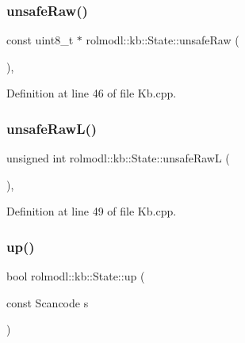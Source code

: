 \subsubsection{\texorpdfstring{unsafeRaw()}{unsafeRaw()}}
{\footnotesize\ttfamily const uint8\+\_\+t $\ast$ rolmodl\+::kb\+::\+State\+::unsafe\+Raw (\begin{DoxyParamCaption}{ }\end{DoxyParamCaption})\hspace{0.3cm}{\ttfamily [static]}, {\ttfamily [noexcept]}}



Definition at line 46 of file Kb.\+cpp.

\mbox{\label{classrolmodl_1_1rolmodl_1_1kb_1_1_state_a9d75c27364e30390190fae9aa40e72f9}} 
\subsubsection{\texorpdfstring{unsafeRawL()}{unsafeRawL()}}
{\footnotesize\ttfamily unsigned int rolmodl\+::kb\+::\+State\+::unsafe\+RawL (\begin{DoxyParamCaption}{ }\end{DoxyParamCaption})\hspace{0.3cm}{\ttfamily [static]}, {\ttfamily [noexcept]}}



Definition at line 49 of file Kb.\+cpp.

\mbox{\label{classrolmodl_1_1rolmodl_1_1kb_1_1_state_a46c1389b6ef3ee77b3bbf71a5ac19849}} 
\subsubsection{\texorpdfstring{up()}{up()}\hspace{0.1cm}{\footnotesize\ttfamily [1/2]}}
{\footnotesize\ttfamily bool rolmodl\+::kb\+::\+State\+::up (\begin{DoxyParamCaption}\item[{const Scancode}]{s }\end{DoxyParamCaption})\hspace{0.3cm}{\ttfamily [static]}}



